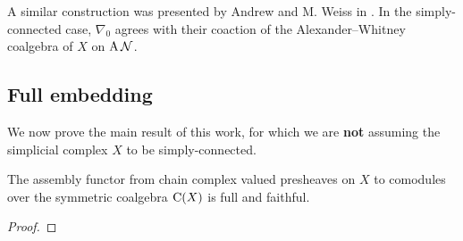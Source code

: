 A similar construction was presented by Andrew and M. Weiss in \cite[Proposition~5.3]{ranicki1990assembly}.
In the simply-connected case, $\nabla_0$ agrees with their coaction of the Alexander--Whitney coalgebra of $X$ on $\operatorname{A} \mathcal{N}$.

\subsection{Full embedding}\label{ss:full embedding}

We now prove the main result of this work, for which we are \textbf{not} assuming the simplicial complex $X$ to be simply-connected.

\begin{theorem*}
	The assembly functor from chain complex valued presheaves on $X$ to comodules over the symmetric coalgebra $\operatorname{C}(X)$ is full and faithful.
\end{theorem*}

\begin{proof}
	
\end{proof}